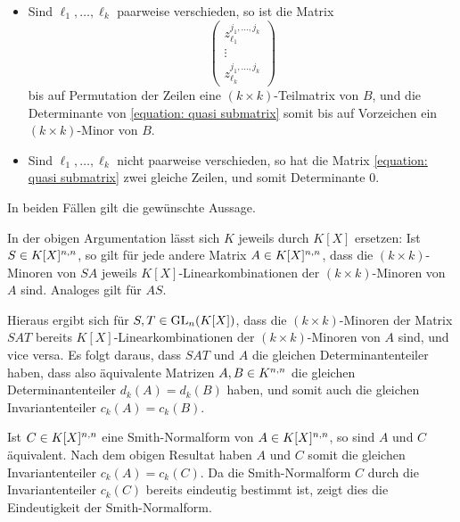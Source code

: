 \begin{itemize}
  \item
    Sind $\ell_1, \dotsc, \ell_k$ paarweise verschieden, so ist die Matrix
    \begin{equation}
      \label{equation: quasi submatrix}
        \begin{pmatrix}
          z_{\ell_1}^{j_1, \dotsc, j_k} \\
          \vdots                        \\
          z_{\ell_k}^{j_1, \dotsc, j_k}
        \end{pmatrix}
    \end{equation}
    bis auf Permutation der Zeilen eine $(k \times k)$-Teilmatrix von $B$, und die Determinante von \eqref{equation: quasi submatrix} somit bis auf Vorzeichen ein $(k \times k)$-Minor von $B$.
  \item
    Sind $\ell_1, \dotsc, \ell_k$ nicht paarweise verschieden, so hat die Matrix \eqref{equation: quasi submatrix} zwei gleiche Zeilen, und somit Determinante $0$.
\end{itemize}
In beiden Fällen gilt die gewünschte Aussage.

\begin{remark}
  In der obigen Argumentation lässt sich $K$ jeweils durch $K[X]$ ersetzen:
  Ist $S \in \matrices{n}{K[X]}$, so gilt für jede andere Matrix $A \in \matrices{n}{K[X]}$, dass die $(k \times k)$-Minoren von $SA$ jeweils $K[X]$-Linearkombinationen der $(k \times k)$-Minoren von $A$ sind.
  Analoges gilt für $AS$.
  
  Hieraus ergibt sich für $S, T \in \GL{n}{K[X]}$, dass die $(k \times k)$-Minoren der Matrix $SAT$ bereits $K[X]$-Linearkombinationen der $(k \times k)$-Minoren von $A$ sind, und vice versa.
  Es folgt daraus, dass $SAT$ und $A$ die gleichen Determinantenteiler haben, dass also äquivalente Matrizen $A, B \in \matrices{n}{K}$ die gleichen Determinantenteiler $d_k(A) = d_k(B)$ haben, und somit auch die gleichen Invariantenteiler $c_k(A) = c_k(B)$.
  
  Ist $C \in \matrices{n}{K[X]}$ eine Smith-Normalform von $A \in \matrices{n}{K[X]}$, so sind $A$ und $C$ äquivalent.
  Nach dem obigen Resultat haben $A$ und $C$ somit die gleichen Invariantenteiler $c_k(A) = c_k(C)$.
  Da die Smith-Normalform $C$ durch die Invariantenteiler $c_k(C)$ bereits eindeutig bestimmt ist, zeigt dies die Eindeutigkeit der Smith-Normalform.
\end{remark}


